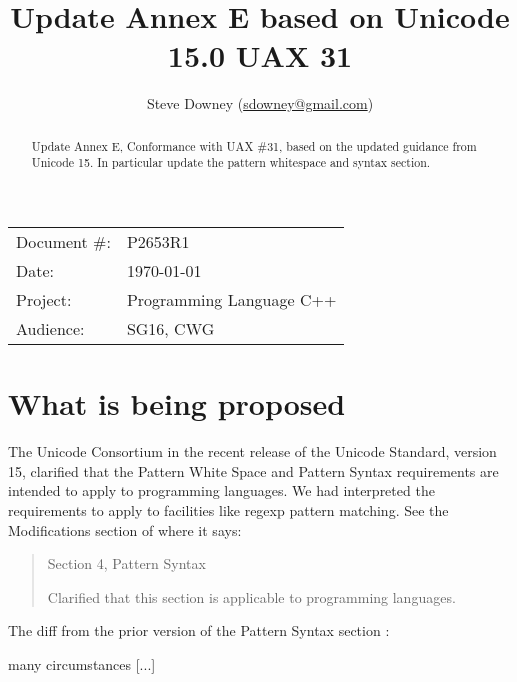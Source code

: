 \documentclass[a4paper,10pt,oneside,openany,final,article]{memoir}
\begin{document}
\title{Update Annex E based on Unicode 15.0 UAX 31}
\author{
Steve Downey \small(\href{mailto:sdowney@gmail.com}{sdowney@gmail.com}) \\
}
\date{} %
\maketitle

\begin{flushright}
\begin{tabular}{ll}
Document \#: & P2653R1 \\
Date: & \today \\
Project: & Programming Language C++ \\
Audience: & SG16, CWG
\end{tabular}
\end{flushright}

\begin{abstract}
Update Annex E, Conformance with UAX \#31, based on the updated guidance from Unicode 15. In particular update the pattern whitespace and syntax section.
\end{abstract}

\tableofcontents*

\chapter{What is being proposed}
The Unicode Consortium in the recent release of the Unicode Standard, version 15, clarified that the Pattern White Space and Pattern Syntax requirements are intended to apply to programming languages. We had interpreted the requirements to apply to facilities like regexp pattern matching. See the Modifications section of \cite{UAX31-15:online} where it says:
\begin{quotation}
  Section 4, Pattern Syntax

  Clarified that this section is applicable to programming languages.
\end{quotation}

The diff from the prior version of the Pattern Syntax section \cite{UAX31-DIFF:online}:

many circumstances [...]
\end{document}
